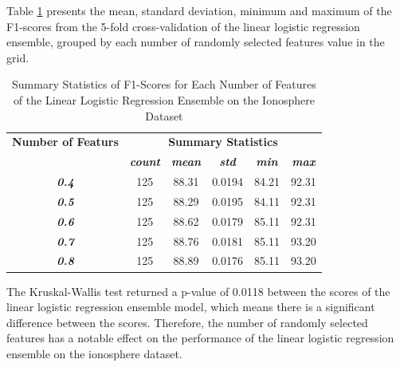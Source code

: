 \documentclass[10pt, conference]{IEEEtran}
\begin{document}
Table \ref{table: I_features_linear_performance_metrics} presents the mean, standard deviation, minimum and maximum of the
F1-scores from the 5-fold cross-validation of the linear logistic regression ensemble, grouped by each number of randomly selected
features value in the grid.
\begin{table}[H]
    \caption{Summary Statistics of F1-Scores for Each Number of Features of the Linear Logistic Regression Ensemble on the Ionosphere Dataset}
    \begin{center}
        \begin{tabular}{|c||c|c|c|c|c|}
            \hline
            \textbf{Number of Featurs}&\multicolumn{5}{|c|}{\textbf{Summary Statistics}} \\
            \cline{2-6}
                       &\textbf{\textit{count}} & \textbf{\textit{mean}} & \textbf{\textit{std}} & \textbf{\textit{min}} & \textbf{\textit{max}}\\
            \hline
            \textbf{\textit{0.4}} & 125 & 88.31 & 0.0194 & 84.21 & 92.31 \\
            \textbf{\textit{0.5}} & 125 & 88.29 & 0.0195 & 84.11 & 92.31 \\
            \textbf{\textit{0.6}} & 125 & 88.62 & 0.0179 & 85.11 & 92.31 \\
            \textbf{\textit{0.7}} & 125 & 88.76 & 0.0181 & 85.11 & 93.20 \\
            \textbf{\textit{0.8}} & 125 & 88.89 & 0.0176 & 85.11 & 93.20 \\
            \hline
        \end{tabular}
    \end{center}
    \label{table: I_features_linear_performance_metrics}
\end{table}
The Kruskal-Wallis test returned a p-value of 0.0118 between the scores of the linear logistic regression ensemble model,
which means there is a significant difference between the scores. Therefore, the number of randomly selected
features has a notable effect on the performance of the linear logistic regression ensemble on the ionosphere dataset.
\end{document}
